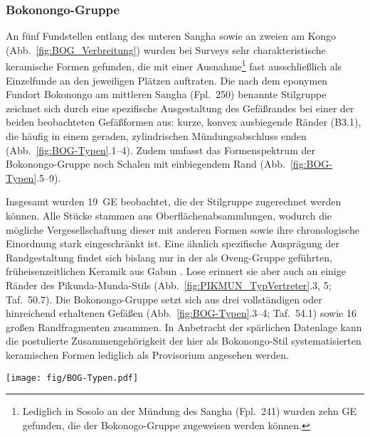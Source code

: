 \subsubsection{Bokonongo-Gruppe}\label{sec:BOG-Gr}

An fünf Fundstellen entlang des unteren \mbox{Sangha} sowie an zweien am Kongo (Abb.~\ref{fig:BOG_Verbreitung}) wurden bei Surveys sehr charakteristische keramische Formen gefunden, die mit einer Ausnahme\footnote{Lediglich in Sosolo an der Mündung des \mbox{Sangha} (Fpl.~241) wurden zehn GE gefunden, die der Bokonogo-Gruppe zugeweisen werden können.} fast ausschließlich als Einzelfunde an den jeweiligen Plätzen auftraten. Die nach dem eponymen Fundort Bokono\-ngo am mittleren \mbox{Sangha} (Fpl.~250) benannte Stilgruppe zeichnet sich durch eine spezifische Ausgestaltung des Gefäßrandes bei einer der beiden beobachteten Gefäßformen aus: kurze, konvex ausbiegende Ränder (B3.1), die häufig in einem geraden, zylindrischen Mündungsabschluss enden (Abb.~\ref{fig:BOG-Typen}.1--4). Zudem umfasst das Formenspektrum der Bokonongo-Gruppe noch Schalen mit einbiegendem Rand (Abb.~\ref{fig:BOG-Typen}.5--9).

Insgesamt wurden 19~GE beobachtet, die der Stilgruppe zugerechnet werden können. Alle Stücke stammen aus Oberflächenabsammlungen, wodurch die mögliche Vergesellschaftung dieser mit anderen Formen sowie ihre chronologische Einordnung stark eingeschränkt ist. Eine ähnlich spezifische Ausprägung der Randgestaltung findet sich bislang nur in der als Oveng-Gruppe geführten, früheisenzeitlichen Keramik aus Gabun \parencites[615--618]{Clist.20042005}[134 Abb. 15]{GonzalesRuibal.2012}[217--299]{SanchezElipe.2015}[351--355]{SanchezElipe.2016}. Lose erinnert sie aber auch an einige Ränder des Pikunda-Munda-Stils (Abb.~\ref{fig:PIKMUN_TypVertreter}.3, 5; Taf.~50.7). Die Bokonongo-Gruppe setzt sich aus drei vollständigen oder hinreichend erhaltenen Gefäßen (Abb.~\ref{fig:BOG-Typen}.3--4; Taf.~54.1) sowie 16 großen Randfragmenten zusammen. In Anbetracht der spärlichen Datenlage kann die postulierte Zusammengehörigkeit der hier als Bokonongo-Stil systematisierten keramischen Formen lediglich als Provisorium angesehen werden.

\begin{figure*}[!tb]
	\centering
	\texttt{[image: fig/BOG-Typen.pdf]}
	\caption{Bokonongo-Gruppe: Typvertreter im nordwestlichen Kongobecken.\\1:~Taf.~40.3; 2:~Taf.~35.9; 3:~Taf.~40.8; 4:~Taf.~51.11; 5: Taf.~29.3; 6: Taf.~36.1; 7: Taf.~36.4; 8: Taf.~29.5; 9: Taf.~32.13.}
	\label{fig:BOG-Typen}
\end{figure*}

